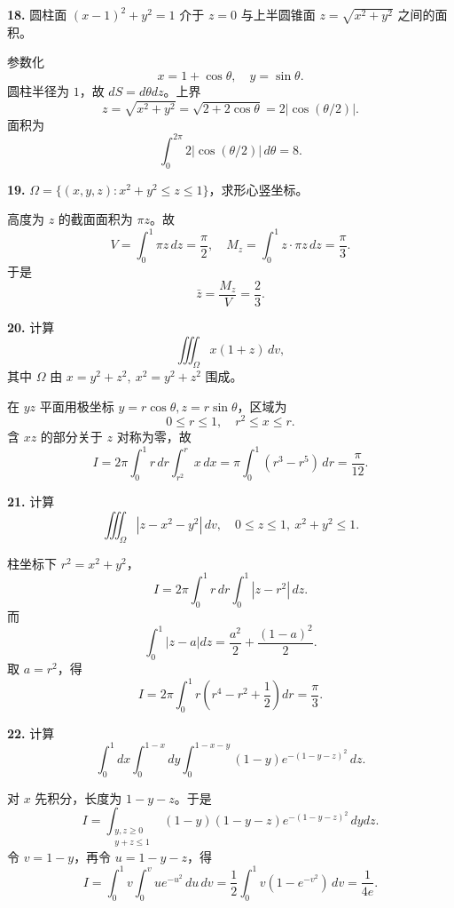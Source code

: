 \begin{problemblock}
\textbf{18.} 圆柱面 \((x-1)^2+y^2=1\) 介于 \(z=0\) 与上半圆锥面 \(z=\sqrt{x^2+y^2}\) 之间的面积。
\end{problemblock}
\begin{solutionblock}
参数化
\[
x=1+\cos\theta,\quad y=\sin\theta.
\]
圆柱半径为 \(1\)，故 \(dS=d\theta dz\)。上界
\[
z=\sqrt{x^2+y^2}=\sqrt{2+2\cos\theta}=2|\cos(\theta/2)|.
\]
面积为
\[
\int_0^{2\pi}2|\cos(\theta/2)|\,d\theta=\boxed{8}.
\]
\end{solutionblock}

\begin{problemblock}
\textbf{19.} \(\Omega=\{(x,y,z):x^2+y^2\le z\le1\}\)，求形心竖坐标。
\end{problemblock}
\begin{solutionblock}
高度为 \(z\) 的截面面积为 \(\pi z\)。故
\[
V=\int_0^1\pi z\,dz=\frac{\pi}{2},
\quad
M_z=\int_0^1z\cdot\pi z\,dz=\frac{\pi}{3}.
\]
于是
\[
\boxed{\bar z=\frac{M_z}{V}=\frac23}.
\]
\end{solutionblock}

\begin{problemblock}
\textbf{20.} 计算
\[
\iiint_\Omega x(1+z)\,dv,
\]
其中 \(\Omega\) 由 \(x=y^2+z^2,\ x^2=y^2+z^2\) 围成。
\end{problemblock}
\begin{solutionblock}
在 \(yz\) 平面用极坐标 \(y=r\cos\theta,z=r\sin\theta\)，区域为
\[
0\le r\le1,\quad r^2\le x\le r.
\]
含 \(xz\) 的部分关于 \(z\) 对称为零，故
\[
I=2\pi\int_0^1r\,dr\int_{r^2}^{r}x\,dx
=\pi\int_0^1(r^3-r^5)\,dr
=\boxed{\frac{\pi}{12}}.
\]
\end{solutionblock}

\begin{problemblock}
\textbf{21.} 计算
\[
\iiint_\Omega |z-x^2-y^2|\,dv,\quad 0\le z\le1,\ x^2+y^2\le1.
\]
\end{problemblock}
\begin{solutionblock}
柱坐标下 \(r^2=x^2+y^2\)，
\[
I=2\pi\int_0^1r\,dr\int_0^1|z-r^2|\,dz.
\]
而
\[
\int_0^1|z-a|dz=\frac{a^2}{2}+\frac{(1-a)^2}{2}.
\]
取 \(a=r^2\)，得
\[
I=2\pi\int_0^1r\left(r^4-r^2+\frac12\right)dr
=\boxed{\frac{\pi}{3}}.
\]
\end{solutionblock}

\begin{problemblock}
\textbf{22.} 计算
\[
\int_0^1dx\int_0^{1-x}dy\int_0^{1-x-y}(1-y)e^{-(1-y-z)^2}\,dz.
\]
\end{problemblock}
\begin{solutionblock}
对 \(x\) 先积分，长度为 \(1-y-z\)。于是
\[
I=\int_{\substack{y,z\ge0\\y+z\le1}}(1-y)(1-y-z)e^{-(1-y-z)^2}\,dydz.
\]
令 \(v=1-y\)，再令 \(u=1-y-z\)，得
\[
I=\int_0^1v\int_0^v u e^{-u^2}\,du\,dv
=\frac12\int_0^1v(1-e^{-v^2})\,dv
=\boxed{\frac1{4e}}.
\]
\end{solutionblock}


